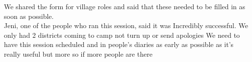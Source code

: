 We shared the form for village roles and said that these needed to be filled in as soon as possible. \\

Jeni, one of the people who ran this session, said it was Incredibly successful. We only had 2 districts coming to camp not turn up or send apologies
We need to have this session scheduled and in people's diaries as early as possible as it's really useful but more so if more people are there
